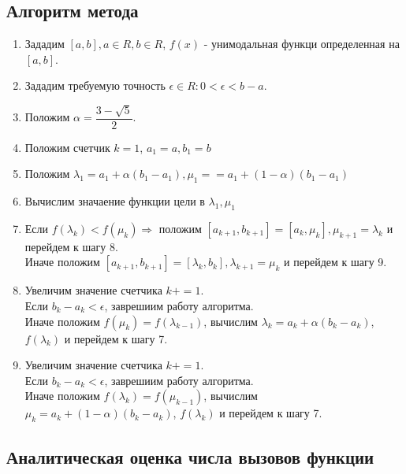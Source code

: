 \documentclass[12pt]{article}
\begin{document}
\subsection{Алгоритм метода}
\begin{enumerate}
    \item Зададим $[a,b], a\in R, b\in R $, $f(x)$ - унимодальная функци определенная на $[a,b]$.
    \item Зададим требуемую точность $\epsilon \in R : 0< \epsilon < b-a$.
    \item Положим $\alpha = \dfrac{3-\sqrt{5}}{2}$.
    \item Положим счетчик $k=1$, $a_1 = a, b_1 = b$ 
    \item Положим $\lambda_1 = a_1 +\alpha(b_1-a_1), \mu_1 = = a_1 +(1-\alpha)(b_1-a_1)$
    \item Вычислим значаение функции цели в $\lambda_1,\mu_1$
    \item Если $f(\lambda_k)< f(\mu_k) \Rightarrow$ положим 
    $[a_{k+1},b_{k+1}]=[a_k, \mu_k], \mu_{k+1}=\lambda_k$ и перейдем к шагу 8.\\
    Иначе положим $[a_{k+1},b_{k+1}]=[\lambda_k, b_k], \lambda_{k+1}=\mu_k$ и перейдем к шагу 9.
    \item Увеличим значение счетчика $k+=1$. \\
    Если $b_k-a_k<\epsilon$, заврешиим работу алгоритма.\\
    Иначе положим $f(\mu_k)=f(\lambda_{k-1})$, вычислим $\lambda_k = a_k +\alpha(b_k-a_k)$, $f(\lambda_k)$ и перейдем к шагу 7.
    \item Увеличим значение счетчика $k+=1$. \\
    Если $b_k-a_k<\epsilon$, заврешиим работу алгоритма.\\
    Иначе положим $f(\lambda_k)=f(\mu_{k-1})$, вычислим $\mu_k = a_k +(1-\alpha)(b_k-a_k)$, $f(\lambda_k)$ и перейдем к шагу 7.
\end{enumerate}



\subsection{Аналитическая оценка числа вызовов функции}
\end{document}
